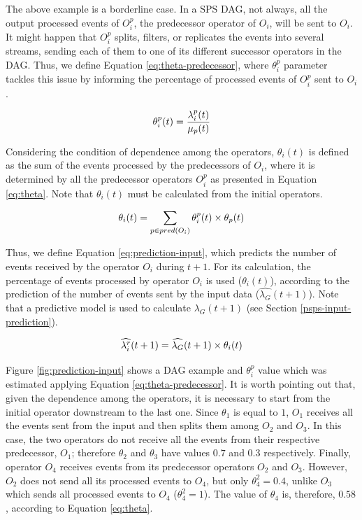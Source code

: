 The above example is a borderline case. In a SPS DAG, not always, all the output processed events of $O_i^p$, the predecessor operator of $O_i$, will be sent to $O_i$. It might happen that $O_i^p$ splits, filters, or replicates the events into several streams, sending each of them to one of its different successor operators in the DAG. Thus, we define Equation \ref{eq:theta-predecessor}, where $\theta_i^p$ parameter tackles this issue by informing the percentage of processed events of $O_i^p$ sent to $O_i$.

\begin{equation}
  \label{eq:theta-predecessor}
  \theta_i^p(t) =  \frac{\lambda^p_i(t)}{\mu_p(t)}\\
\end{equation}

Considering the condition of dependence among the operators, $\theta_{i}(t)$ is defined as the sum of the events processed by the predecessors of $O_i$, where it is determined by all the predecessor operators $O^p_i$ as presented in Equation \ref{eq:theta}. Note that $\theta_i(t)$ must be calculated from the initial operators.

\begin{equation}
  \label{eq:theta}
  \theta_i(t) =  \sum_{p \in pred(O_i)} \theta_i^p(t) \times \theta_p(t)\\
\end{equation}

Thus, we define Equation \ref{eq:prediction-input}, which predicts the number of events received by the operator $O_i$ during $t+1$. For its calculation, the percentage of events processed by operator $O_i$ is used ($\theta_i(t)$), according to the prediction of the number of events sent by the input data ($\widehat{\lambda_G}(t+1)$). Note that a predictive model is used to calculate $\widehat{\lambda_G}(t+1)$ (see Section \ref{psps-input-prediction}).

\begin{equation}
    \label{eq:prediction-input}
  \widehat{\lambda_i^r}(t+1) =  \widehat{\lambda_G}(t+1) \times \theta_i(t)\\
\end{equation}

Figure \ref{fig:prediction-input} shows a DAG example and $\theta_i^p$ value which was  estimated applying Equation \ref{eq:theta-predecessor}. It is worth pointing out that, given the dependence among the operators, it is necessary to start from the initial operator downstream to the last one. Since $\theta_1$ is equal to $1$, $O_1$ receives all the events sent from the input and then splits them among $O_2$ and $O_3$.  In this case, the two operators do not receive all the events from their respective predecessor, $O_1$; therefore $\theta_2$ and $\theta_3$ have values $0.7$ and $0.3$ respectively. Finally, operator $O_4$ receives events from its predecessor operators $O_2$ and $O_3$. However, $O_2$ does not send all its processed events to $O_4$, but only $\theta_4^2=0.4$, unlike $O_3$ which sends all processed events to $O_4$ ($\theta_4^2=1$). The value of $\theta_4$ is, therefore, $0.58$, according to Equation \ref{eq:theta}. 

